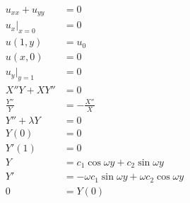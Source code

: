 \documentclass{article}
\begin{document}
\setcounter{subsubsection}{6}
\subsubsection{}

\begin{align*}
  u_{x x} + u_{y y} & = 0                                                                                                                \\
  u_x|_{x = 0}      & = 0                                                                                                                \\
  u(1, y)           & = u_0                                                                                                              \\
  u(x, 0)           & = 0                                                                                                                \\
  u_y|_{y = 1}      & = 0                                                                                                                \\
  X'' Y + X Y''     & = 0                                                                                                                \\
  \frac{Y''}{Y}     & = -\frac{X''}{X}                                                                                                   \\
  Y'' + \lambda Y   & = 0                                                                                                                \\
  Y(0)              & = 0                                                                                                                \\
  Y'(1)             & = 0                                                                                                                \\
  Y                 & = c_1 \cos \omega y + c_2 \sin \omega y                                                                            \\
  Y'                & = -\omega c_1 \sin \omega y + \omega c_2 \cos \omega y                                                             \\
  0                 & = Y(0)                                                                                                             \\

\end{align*}
\end{document}
